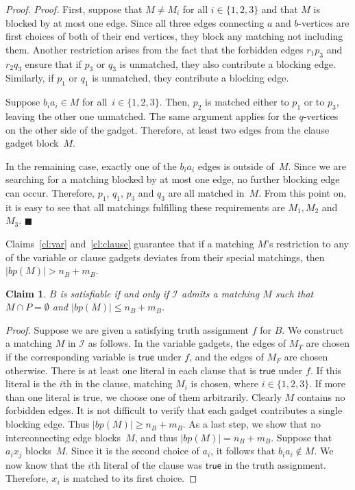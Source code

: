 \documentclass[preprint,12pt]{elsarticle}
\newcommand{\myqed}{$\blacksquare$}
\newcommand{\myproof}{\noindent\textit{Proof. }}
\newtheorem{claim}[theorem]{Claim}
\newcommand{\true}{\mathsf{true}}
\begin{document}
\begin{proof}
	\myproof First, suppose that $M \neq M_i$ for all $i \in \{1,2,3\}$ and that $M$ is blocked by at most one edge. Since all three edges connecting $a$ and $b$-vertices are first choices of both of their end vertices, they block any matching not including them. Another restriction arises from the fact that the forbidden edges $r_1p_3$ and $r_2q_3$ ensure that if $p_3$ or $q_3$ is unmatched, they also contribute a blocking edge. Similarly, if $p_1$ or $q_1$ is unmatched, they contribute a blocking edge.
	
	Suppose $b_ia_i \in M$ for all~$i \in \{1,2,3\}$. Then, $p_2$ is matched either to $p_1$ or to $p_3$, leaving the other one unmatched. The same argument applies for the $q$-vertices on the other side of the gadget. Therefore, at least two edges from the clause gadget block~$M$. 
	
	In the remaining case, exactly one of the $b_ia_i$ edges is outside of~$M$. Since we are searching for a matching blocked by at most one edge, no further blocking edge can occur. Therefore, $p_1$, $q_1$, $p_3$ and $q_3$ are all matched in~$M$. From this point on, it is easy to see that all matchings fulfilling these requirements are $M_1, M_2$ and~$M_3$.  \myqed

Claims~\ref{cl:var} and~\ref{cl:clause} guarantee that if a matching $M$'s restriction to any of the variable or clause gadgets deviates from their special matchings, then $|bp(M)| > n_B+m_B$. 

\begin{claim}
$B$ is satisfiable if and only if $\mathcal I$ admits a matching $M$ such that $M\cap P=\emptyset$ and $|bp(M)|\leq n_B+m_B$.
\end{claim}

	\myproof Suppose we are given a satisfying truth assignment $f$ for $B$.  We construct a matching $M$ in $\mathcal I$ as follows.  In the variable gadgets, the edges of $M_T$ are chosen if the corresponding variable is $\true$ under $f$, and the edges of $M_F$ are chosen otherwise. There is at least one literal in each clause that is $\true$ under $f$.  If this literal is the $i$th in the clause, matching $M_i$ is chosen, where $i \in \{1,2,3\}$.  If more than one literal is true, we choose one of them arbitrarily.  Clearly $M$ contains no forbidden edges.  It is not difficult to verify that each gadget contributes a single blocking edge.  Thus $|bp(M)|\geq n_B+m_B$.  As a last step, we show that no interconnecting edge blocks~$M$, and thus $|bp(M)|=n_B+m_B$. Suppose that $a_i x_j$ blocks~$M$. Since it is the second choice of $a_i$, it follows that $b_i a_i \notin M$. We now know that the $i$th literal of the clause was $\true$ in the truth assignment. Therefore, $x_i$ is matched to its first choice.
	

\end{proof}
\end{document}
